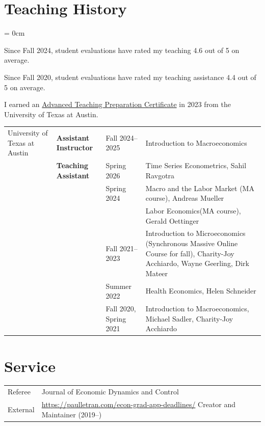 \documentclass[a4paper, 10pt]{article}
\begin{document}
  \section{Teaching History}\label{sec:teaching_history}
  \begin{compactitem}\parskip = 0cm
    \item Since Fall 2024, student evaluations have rated my teaching 4.6 out of 5 on average.
    \item Since Fall 2020, student evaluations have rated my teaching assistance 4.4 out of 5 on average.
    \item I earned an \href{https://ctl.utexas.edu/teaching-preparation-series}{Advanced Teaching Preparation Certificate} in 2023 from the University of Texas at Austin.
  \end{compactitem}
  \vspace{1em}
  \begin{tabular}{p{2.3cm} p{3.1cm} p{2.3cm} p{6.4cm}}
    University of \newline Texas at Austin & \textbf{Assistant Instructor} & Fall 2024--2025 & Introduction to Macroeconomics\\
    & \textbf{Teaching Assistant} & Spring 2026 & Time Series Econometrics, Sahil Ravgotra\\
    & & Spring 2024 & Macro and the Labor Market \newline (MA course), Andreas Mueller\\
    & & & Labor Economics\newline (MA course), Gerald Oettinger\\
    & & Fall 2021--2023 & Introduction to Microeconomics \newline (Synchronous Massive Online Course \newline for fall), Charity-Joy Acchiardo, \newline Wayne Geerling, Dirk Mateer\\
    & & Summer 2022 & Health Economics, Helen Schneider\\
    & & Fall 2020, \newline Spring 2021 & Introduction to Macroeconomics, \newline Michael Sadler, Charity-Joy Acchiardo
  \end{tabular}

  \section{Service}
  \begin{tabular}{l p{13.8cm}}
    Referee & Journal of Economic Dynamics and Control\\
    External & \href{https://paulletran.com/econ-grad-app-deadlines/}{https://paulletran.com/econ-grad-app-deadlines/} Creator and Maintainer (2019--)\\
  \end{tabular}
\end{document}
